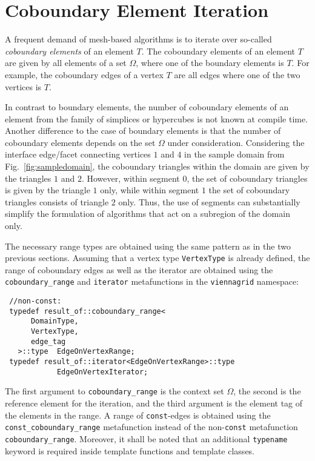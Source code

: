 \section{Coboundary Element Iteration}
A frequent demand of mesh-based algorithms is to iterate over so-called \emph{coboundary elements} of an element $T$.
The coboundary elements of an element $T$ are given by all elements of a set $\Omega$, where one of the boundary elements is $T$.
For example, the coboundary edges of a vertex $T$ are all edges where one of the two vertices is $T$.

In contrast to boundary elements, the number of coboundary elements of an element from the family of simplices or hypercubes is not known at compile time.
Another difference to the case of boundary elements is that the number of coboundary elements depends on the set $\Omega$ under consideration.
Considering the interface edge/facet connecting vertices $1$ and $4$ in the sample domain from Fig.~\ref{fig:sampledomain}, the coboundary triangles within the domain are given by the triangles $1$ and $2$.
However, within segment $0$, the set of coboundary triangles is given by the triangle $1$ only, while within segment $1$ the set of coboundary triangles consists of triangle $2$ only.
Thus, the use of segments can substantially simplify the formulation of algorithms that act on a subregion of the domain only.

The necessary range types are obtained using the same pattern as in the two previous sections.
Assuming that a vertex type \lstinline|VertexType| is already defined, the range of coboundary edges as well as the iterator are obtained
using the \lstinline|coboundary_range| and \lstinline|iterator| metafunctions in the \lstinline|viennagrid| namespace:
\begin{lstlisting}
 //non-const:
 typedef result_of::coboundary_range<
      DomainType,
      VertexType,
      edge_tag
   >::type  EdgeOnVertexRange;
 typedef result_of::iterator<EdgeOnVertexRange>::type
            EdgeOnVertexIterator;
\end{lstlisting}
The first argument to \lstinline|coboundary_range| is the context set $\Omega$, the second is the reference element for the iteration, and the third argument is the element tag of the elements in the range.
A range of \lstinline|const|-edges is obtained using the \lstinline|const_coboundary_range| metafunction instead of the non-\lstinline|const| metafunction \lstinline|coboundary_range|.
Moreover, it shall be noted that an additional \lstinline|typename| keyword is required inside template functions and template classes.

